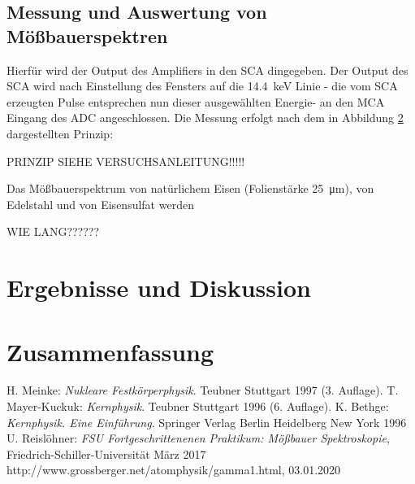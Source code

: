 \documentclass[a4paper,twoside,final]{article}
\begin{document}
\subsection{Messung und Auswertung von Mößbauerspektren}
Hierfür wird der Output des Amplifiers in den SCA dingegeben. Der Output des SCA wird nach Einstellung des Fensters auf die \SI{14,4}{\kilo\eV} Linie - die vom SCA erzeugten Pulse entsprechen nun dieser ausgewählten Energie-
an den MCA Eingang des ADC angeschlossen.
Die Messung erfolgt nach dem in Abbildung \ref{} dargestellten Prinzip:

PRINZIP SIEHE VERSUCHSANLEITUNG!!!!!

Das Mößbauerspektrum von natürlichem Eisen (Folienstärke \SI{25}{\micro\meter}), von Edelstahl und von Eisensulfat werden

WIE LANG??????



\newpage
\section{Ergebnisse und Diskussion}


\section{Zusammenfassung}

\begin{thebibliography}{xxx}
	H. Meinke: \textit{Nukleare Festkörperphysik}. Teubner Stuttgart 1997 (3. Auflage).
	T. Mayer-Kuckuk: \textit{Kernphysik}. Teubner Stuttgart 1996 (6. Auflage).
  K. Bethge: \textit{Kernphysik. Eine Einführung}. Springer Verlag Berlin Heidelberg New York 1996
  U. Reislöhner: \textit{FSU Fortgeschrittenenen Praktikum: Mößbauer Spektroskopie}, Fried\-rich-Schil\-ler-Uni\-versi\-tät März 2017
  http://www.grossberger.net/atomphysik/gamma1.html, 03.01.2020
\end{thebibliography}
\end{document}

